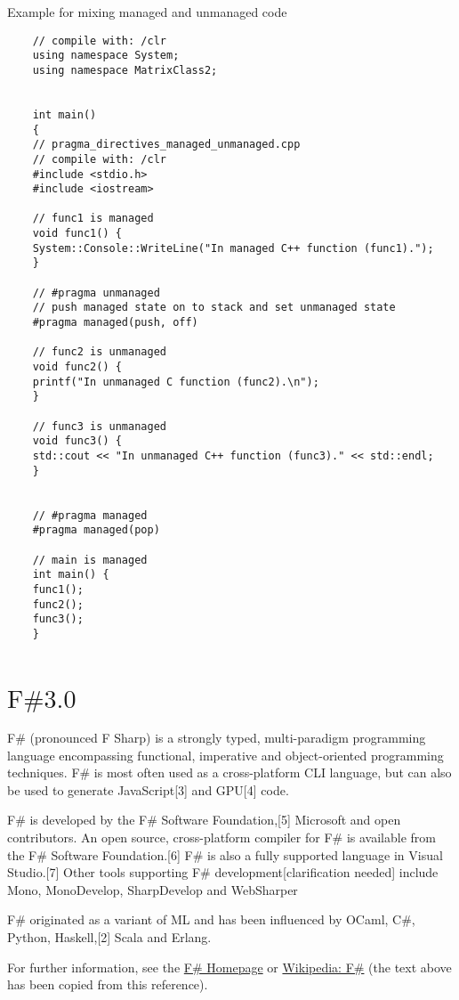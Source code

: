 	
	
	\noindent Example for mixing managed and unmanaged code 
	
	
	\begin{lstlisting}
	// compile with: /clr
	using namespace System;
	using namespace MatrixClass2;
	
	
	int main() 
	{
	// pragma_directives_managed_unmanaged.cpp
	// compile with: /clr
	#include <stdio.h>
	#include <iostream>
	
	// func1 is managed
	void func1() {
	System::Console::WriteLine("In managed C++ function (func1).");
	}
	
	// #pragma unmanaged
	// push managed state on to stack and set unmanaged state
	#pragma managed(push, off)
	
	// func2 is unmanaged
	void func2() {
	printf("In unmanaged C function (func2).\n");
	}
	
	// func3 is unmanaged
	void func3() {
	std::cout << "In unmanaged C++ function (func3)." << std::endl;
	}
	
	
	// #pragma managed
	#pragma managed(pop)
	
	// main is managed
	int main() {
	func1();
	func2();
	func3();
	}
	
	\end{lstlisting}
	
	
	
	\newpage
	\section{\texorpdfstring{$\text{F\# 3.0 } $}{FSharp}}
	F\# (pronounced F Sharp) is a strongly typed, multi-paradigm programming language encompassing functional, imperative and object-oriented programming techniques. F\# is most often used as a cross-platform CLI language, but can also be used to generate JavaScript[3] and GPU[4] code.
	
	F\# is developed by the F\# Software Foundation,[5] Microsoft and open contributors. An open source, cross-platform compiler for F\# is available from the F\# Software Foundation.[6] F\# is also a fully supported language in Visual Studio.[7] Other tools supporting F\# development[clarification needed] include Mono, MonoDevelop, SharpDevelop and WebSharper
	
	F\# originated as a variant of ML and has been influenced by OCaml, C\#, Python, Haskell,[2] Scala and Erlang.
	
	
	For further information, see the \href{http://fsharp.org/}{F\# Homepage} or  \href{http://en.wikipedia.org/wiki/F_Sharp_(programming_language)}{Wikipedia: F\#} (the text above has been copied from this reference).
	
